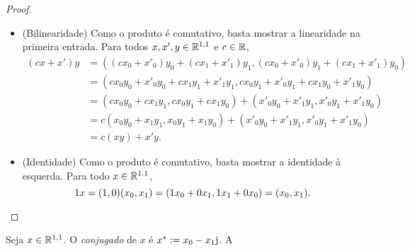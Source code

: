 \begin{proof}
\begin{itemize}
	\item (Bilinearidade) Como o produto é comutativo, basta mostrar a linearidade na primeira entrada. Para todos $x,x',y \in \mathbb{R}^{1,1}$ e $c \in \mathbb{R}$,
		\begin{align*}
		(cx+x')y &= ((cx_0+x'_0)y_0 + (cx_1+x'_1)y_1, (cx_0+x'_0)y_1 + (cx_1+x'_1)y_0) \\
			&= (cx_0y_0+x'_0y_0 + cx_1y_1+x'_1y_1, cx_0y_1+x'_0y_1 + cx_1y_0+x'_1y_0) \\
			&= (cx_0y_0+cx_1y_1, cx_0y_1+cx_1y_0) + (x'_0y_0+x'_1y_1, x'_0y_1+x'_1y_0) \\
			&= c(x_0y_0+x_1y_1, x_0y_1+x_1y_0) + (x'_0y_0+x'_1y_1, x'_0y_1+x'_1y_0) \\
			&= c(xy) + x'y.
		\end{align*}
	\item (Identidade) Como o produto é comutativo, basta mostrar a identidade à esquerda. Para todo $x \in \mathbb{R}^{1,1}$,
		\begin{equation*}
		1x = (1,0)(x_0,x_1) = (1x_0+0x_1, 1x_1+0x_0) = (x_0, x_1).
		\qedhere
		\end{equation*}
\end{itemize}
\end{proof}

\begin{definition}
Seja $x \in \mathbb{R}^{1,1}$. O \emph{conjugado} de $x$ é ${x}^{\ast} := x_0 - x_1\mathrm{j}$. A
\end{definition}

